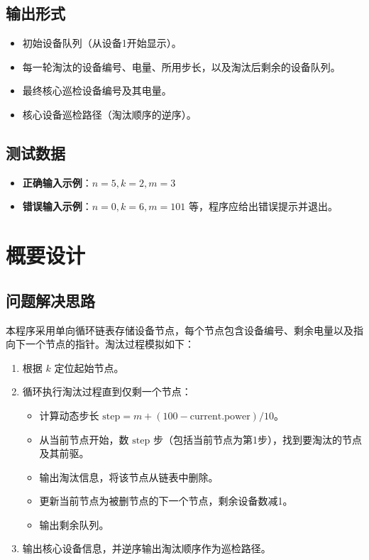 \documentclass[UTF8]{ctexart}
\begin{document}
\subsection{输出形式}
\begin{itemize}
    \item 初始设备队列（从设备1开始显示）。
    \item 每一轮淘汰的设备编号、电量、所用步长，以及淘汰后剩余的设备队列。
    \item 最终核心巡检设备编号及其电量。
    \item 核心设备巡检路径（淘汰顺序的逆序）。
\end{itemize}

\subsection{测试数据}
\begin{itemize}
    \item \textbf{正确输入示例}：\( n=5, k=2, m=3 \)
    \item \textbf{错误输入示例}：\( n=0, k=6, m=101 \) 等，程序应给出错误提示并退出。
\end{itemize}

\section{概要设计}

\subsection{问题解决思路}
本程序采用单向循环链表存储设备节点，每个节点包含设备编号、剩余电量以及指向下一个节点的指针。淘汰过程模拟如下：
\begin{enumerate}
    \item 根据 \( k \) 定位起始节点。
    \item 循环执行淘汰过程直到仅剩一个节点：
        \begin{itemize}
            \item 计算动态步长 \( \mathrm{step} = m + (100 - \mathrm{current.power})/10 \)。
            \item 从当前节点开始，数 \( \mathrm{step} \) 步（包括当前节点为第1步），找到要淘汰的节点及其前驱。
            \item 输出淘汰信息，将该节点从链表中删除。
            \item 更新当前节点为被删节点的下一个节点，剩余设备数减1。
            \item 输出剩余队列。
        \end{itemize}
    \item 输出核心设备信息，并逆序输出淘汰顺序作为巡检路径。
\end{enumerate}
\end{document}
